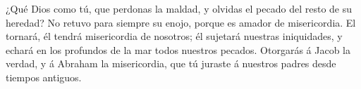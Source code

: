  ¿Qué Dios como tú, que perdonas la maldad, y olvidas el
pecado del resto de su heredad? No retuvo para siempre su enojo, porque
es amador de misericordia.  El tornará, él tendrá
misericordia de nosotros; él sujetará nuestras iniquidades, y echará en
los profundos de la mar todos nuestros pecados. 
Otorgarás á Jacob la verdad, y á Abraham la misericordia, que tú juraste
á nuestros padres desde tiempos antiguos.

